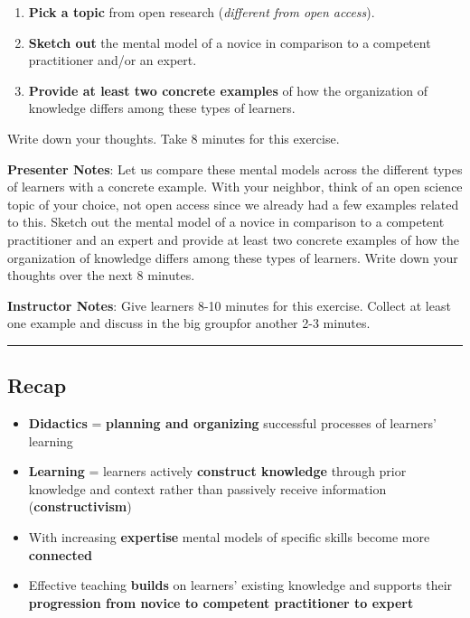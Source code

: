 \documentclass[
  letterpaper,
  DIV=11,
  numbers=noendperiod]{scrartcl}
\providecommand{\tightlist}{%
  \setlength{\itemsep}{0pt}\setlength{\parskip}{0pt}}
\begin{document}
\begin{enumerate}
\def\labelenumi{\arabic{enumi}.}
\tightlist
\item
  \textbf{Pick a topic} from open research (\emph{different from open
  access}).
\item
  \textbf{Sketch out} the mental model of a novice in comparison to a
  competent practitioner and/or an expert.
\item
  \textbf{Provide at least two concrete examples} of how the
  organization of knowledge differs among these types of learners.
\end{enumerate}

Write down your thoughts. Take 8 minutes for this exercise.

\textbf{Presenter Notes}: Let us compare these mental models across the
different types of learners with a concrete example. With your neighbor,
think of an open science topic of your choice, not open access since we
already had a few examples related to this. Sketch out the mental model
of a novice in comparison to a competent practitioner and an expert and
provide at least two concrete examples of how the organization of
knowledge differs among these types of learners. Write down your
thoughts over the next 8 minutes.

\textbf{Instructor Notes}: Give learners 8-10 minutes for this exercise.
Collect at least one example and discuss in the big groupfor another 2-3
minutes.

\begin{center}\rule{0.5\linewidth}{0.5pt}\end{center}

\subsection{Recap}\label{recap}

\begin{itemize}
\tightlist
\item
  \textbf{Didactics} = \textbf{planning and organizing} successful
  processes of learners' learning
\item
  \textbf{Learning} = learners actively \textbf{construct knowledge}
  through prior knowledge and context rather than passively receive
  information (\textbf{constructivism})
\item
  With increasing \textbf{expertise} mental models of specific skills
  become more \textbf{connected}
\item
  Effective teaching \textbf{builds} on learners' existing knowledge and
  supports their \textbf{progression from novice to competent
  practitioner to expert}
\end{itemize}
\end{document}
